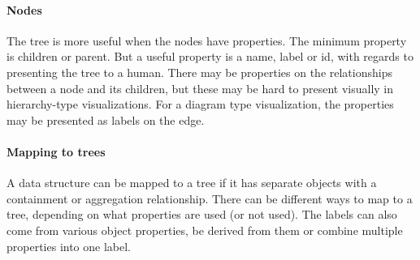 \paragraph{Nodes}
The tree is more useful when the nodes have properties.
The minimum property is children or parent.
But a useful property is a name, label or id, with regards to presenting the tree to a human.
There may be properties on the relationships between a node and its children, but these may be hard to present visually in hierarchy-type visualizations.
For a diagram type visualization, the properties may be presented as labels on the edge.

\paragraph{Mapping to trees}
A data structure can be mapped to a tree if it has separate objects with a containment or aggregation relationship.
There can be different ways to map to a tree, depending on what properties are used (or not used).
The labels can also come from various object properties, be derived from them or combine multiple properties into one label.
